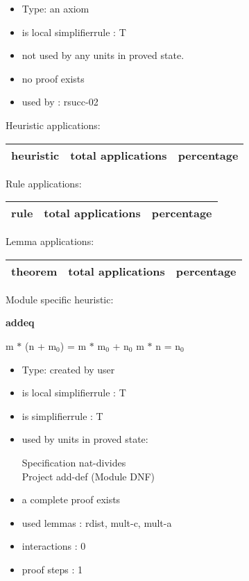 \documentclass[a4paper]{article}
\begin{document}
\begin{itemize}

\item Type: an axiom

\item is local simplifierrule : T
\item not used by any units in proved state.
\item       no proof exists
\item       used by      : rsucc-02
\end{itemize}

\medskip


Heuristic applications:

\begin{supertabular}{l|r|r}
heuristic	& total applications & percentage \\ \hline

\end{supertabular}

Rule applications:

\begin{supertabular}{l|r|r}
rule	        & total applications & percentage \\ \hline

\end{supertabular}

Lemma applications:

\begin{supertabular}{l|r|r}
theorem	        & total applications & percentage \\ \hline

\end{supertabular}

Module specific heuristic:

\pagebreak

{\LARGE\bf addeq}\label{lemma-addeq}

\medskip

 \Fol m $*$ (n + $\mbox{m}_{0}$) = m $*$ $\mbox{m}_{0}$ + $\mbox{n}_{0}$ \Equiv m $*$ n = $\mbox{n}_{0}$

\begin{itemize}

\item Type: created by user

\item is local simplifierrule : T
\item is simplifierrule : T
\item used by units in proved state:

Specification nat-divides \\
Project add-def (Module DNF)
\item       a complete proof exists
\item       used lemmas  : rdist, mult-c, mult-a
\item       interactions : 0
\item       proof steps  : 1
\end{itemize}
\end{document}

